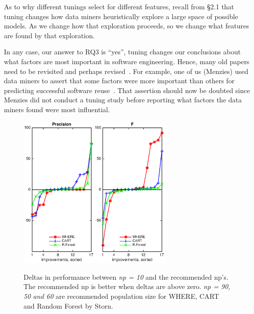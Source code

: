\documentclass{sig-alternative}
\begin{document}
As to why different tunings select for different features,  recall from {\S}2.1 that tuning changes how data miners
heuristically explore a large space of possible models. As we change how that exploration proceeds,
so we change what features are found by that exploration.

In any case, our answer to RQ3 is ``yes'', tuning changes our
conclusions about what factors are most important in software engineering.
Hence, many old papers    need to be revisited  and perhaps revised~\cite{bell2013limited,rahman2013how,me02k,Moser:2008,zimmermann2007predicting,herzig2013predicting}.  
For example, one of us (Menzies) used data miners
to assert that some factors were more important than others for predicting
successful software reuse~\cite{me02k}. That assertion should now be doubted since Menzies did not conduct a tuning study before reporting what factors the data miners
found were most influential.

\begin{figure}[!t]
\begin{center}
\includegraphics[width=1.5in]{np_precision.eps}\includegraphics[width=1.5in]{np_f.eps}
 \end{center}
\caption{Deltas in performance between {\em np = 10} and the recommended np's. The recommended np is better when deltas are above zero. {\em np = 90, 50 and 60} are recommended population size for WHERE, CART and Random Forest by Storn.}\label{fig:deltas_np}
 \end{figure}
\end{document}
